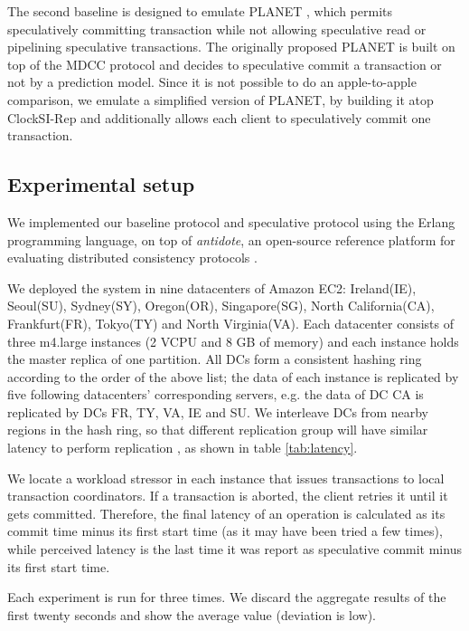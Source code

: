 The second baseline is designed to emulate PLANET \cite{pang2014planet}, which permits speculatively committing transaction while not allowing speculative read or pipelining speculative transactions.  The originally proposed PLANET is built on top of the MDCC protocol \cite{kraska2013mdcc} and decides to speculative commit a transaction or not by a prediction model. Since it is not possible to do an apple-to-apple comparison, we emulate a simplified version of PLANET, by building it atop ClockSI-Rep and additionally allows each client to speculatively commit one transaction. 

\subsection{Experimental setup}
\label{subsec:setup}
We implemented our baseline protocol and speculative protocol using the Erlang programming language, on top of \textit{antidote}, an open-source reference platform for evaluating distributed consistency protocols \cite{antidote}.

We deployed the system in nine datacenters of Amazon EC2: Ireland(IE), Seoul(SU), Sydney(SY), Oregon(OR), Singapore(SG), North California(CA), Frankfurt(FR), Tokyo(TY) and North Virginia(VA). Each datacenter consists of three m4.large instances (2 VCPU and 8 GB of memory) and each instance holds the master replica of one partition. All DCs form a consistent hashing ring according to the order of the above list; the data of each instance is replicated by five following datacenters' corresponding servers, e.g. the data of DC CA is replicated by DCs FR, TY, VA, IE and SU. We interleave DCs from nearby regions in the hash ring, so that different replication group will have similar latency to perform replication , as shown in table \ref{tab:latency}.

We locate a workload stressor in each instance that issues transactions to local transaction coordinators. If a transaction is aborted, the client retries it until it gets committed. Therefore, the final latency of an operation is calculated as its commit time minus its first start time (as it may have been tried a few times), while perceived latency is the last time it was report as speculative commit minus its first start time.

Each experiment is run for three times. We discard the aggregate results of the first twenty seconds and show the average value (deviation is low).

